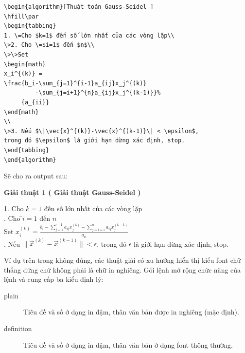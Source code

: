 \documentclass[a4paper]{report}
\begin{document}
\begin{enumerate}
\begin{code}
\begin{verbatim}
\begin{algorithm}[Thuật toán Gauss-Seidel ]
\hfill\par
\begin{tabbing}
1. \=Cho $k=1$ đến số lớn nhất của các vòng lặp\\
\>2. Cho \=$i=1$ đến $n$\\
\>\>Set 
\begin{math}
x_i^{(k)} = 
\frac{b_i-\sum_{j=1}^{i-1}a_{ij}x_j^{(k)}
         -\sum_{j=i+1}^{n}a_{ij}x_j^{(k-1)}}%
     {a_{ii}}
\end{math}
\\
\>3. Nếu $\|\vec{x}^{(k)}-\vec{x}^{(k-1)}\| < \epsilon$, 
trong đó $\epsilon$ là giới hạn dừng xác định, stop.
\end{tabbing}
\end{algorithm}
\end{verbatim}
\end{code}%
Sẽ cho ra output sau:
\begin{result}
\textbf{Giải thuật 1 ( Giải thuật Gauss-Seidel )}
\hfill\par
\begin{itshape}
\begin{tabbing}
1. \=Cho $k=1$ đến số lớn nhất của các vòng lặp\\
. Cho \=$i=1$ đến $n$\\
\>\>Set 
\begin{math}
x_i^{(k)} = \frac{b_i-\sum_{j=1}^{i-1}a_{ij}x_j^{(k)}-\sum_{j=i+1}^{n}a_{ij}x_j^{(k-1)}}%
{a_{ii}}
\end{math}
\\
. Nếu $\|\vec{x}^{(k)}-\vec{x}^{(k-1)}\| < \epsilon$,  
trong đó $\epsilon$ là giới hạn dừng xác định, stop.
\end{tabbing}
\end{itshape}
\end{result}

Ví dụ trên trong không đúng, các thuật giải có xu hướng hiển thị kiểu font chữ thẳng đứng chứ không phải là chữ in nghiêng. Gói lệnh  mở rộng chức năng của lệnh  và cung cấp ba kiểu định lý:

\begin{description}
\item[plain] Tiêu đề và số ở dạng in đậm, thân văn bản được in nghiêng (mặc định).

\item[definition] Tiêu đề và số ở dạng in đậm, thân văn bản ở dạng font thông thường.


\end{description}
\end{enumerate}
\end{document}
